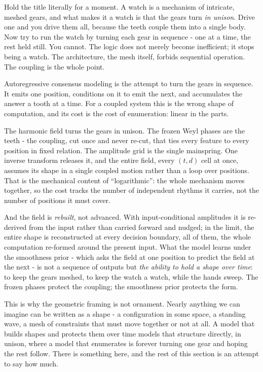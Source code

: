Hold the title literally for a moment. A watch is a mechanism of intricate, meshed gears, and what makes it a watch is that the gears turn \textit{in unison}. Drive one and you drive them all, because the teeth couple them into a single body. Now try to run the watch by turning each gear in sequence - one at a time, the rest held still. You cannot. The logic does not merely become inefficient; it stops being a watch. The architecture, the mesh itself, forbids sequential operation. The coupling is the whole point.

Autoregressive consensus modeling is the attempt to turn the gears in sequence. It emits one position, conditions on it to emit the next, and accumulates the answer a tooth at a time. For a coupled system this is the wrong shape of computation, and its cost is the cost of enumeration: linear in the parts.

The harmonic field turns the gears in unison. The frozen Weyl phases are the teeth - the coupling, cut once and never re-cut, that ties every feature to every position in fixed relation. The amplitude grid is the single mainspring. One inverse transform releases it, and the entire field, every $(t,d)$ cell at once, assumes its shape in a single coupled motion rather than a loop over positions. That is the mechanical content of ``logarithmic'': the whole mechanism moves together, so the cost tracks the number of independent rhythms it carries, not the number of positions it must cover.

And the field is \textit{rebuilt}, not advanced. With input-conditional amplitudes it is re-derived from the input rather than carried forward and nudged; in the limit, the entire shape is reconstructed at every decision boundary, all of them, the whole computation re-formed around the present input. What the model learns under the smoothness prior - which asks the field at one position to predict the field at the next - is not a sequence of outputs but \textit{the ability to hold a shape over time}: to keep the gears meshed, to keep the watch a watch, while the hands sweep. The frozen phases protect the coupling; the smoothness prior protects the form.

This is why the geometric framing is not ornament. Nearly anything we can imagine can be written as a shape - a configuration in some space, a standing wave, a mesh of constraints that must move together or not at all. A model that builds shapes and protects them over time models that structure directly, in unison, where a model that enumerates is forever turning one gear and hoping the rest follow. There is something here, and the rest of this section is an attempt to say how much.

